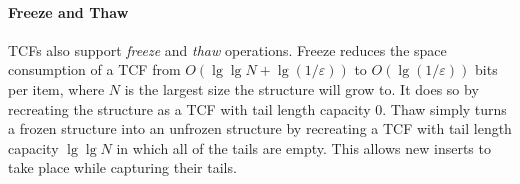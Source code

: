 \documentclass[sigconf]{acmart}
\newcommand{\etal}{et al.}
\begin{document}
\paragraph{Freeze and Thaw}
TCFs also support {\em freeze} and {\em thaw} operations.
Freeze reduces the space consumption of a TCF from $O(\lg \lg N + \lg (1/\varepsilon))$ to $O(\lg (1 / \varepsilon))$ bits per item, where $N$ is the largest size the structure will grow to.
It does so by recreating the structure as a TCF with tail length capacity $0$.
Thaw simply turns a frozen structure into an unfrozen structure by recreating a TCF with tail length capacity $\lg \lg N$ in which all of the tails are empty.
This allows new inserts to take place while capturing their tails.



\end{document}
